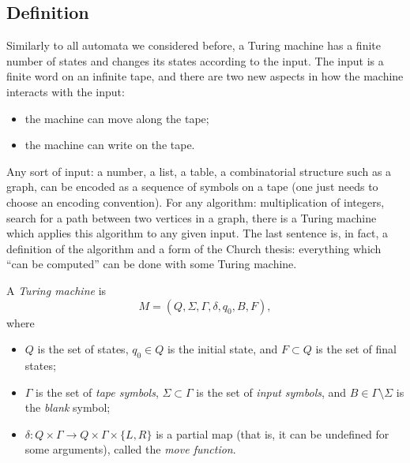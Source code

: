\begin{page}
\setcounter{section}{8}
\setcounter{subsection}{1}
\setcounter{dfn}{0}
\label{portion:1324}

\subsection{Definition}
Similarly to all automata we considered before,
a Turing machine has a finite number of states and changes its states according to the input.
The input is a finite word on an infinite tape, and there are two new aspects in how the machine interacts with the input:
\begin{itemize}
\item
the machine can move along the tape;
\item
the machine can write on the tape.
\end{itemize}

Any sort of input: a number, a list, a table, a combinatorial structure such as a graph,
can be encoded as a sequence of symbols on a tape (one just needs to choose an encoding convention).
For any algorithm: multiplication of integers, search for a path between two vertices in a graph,
there is a Turing machine which applies this algorithm to any given input.
The last sentence is, in fact, a definition of the algorithm and a form of the Church thesis:
everything which ``can be computed'' can be done with some Turing machine.


\end{page}

\begin{page}
\setcounter{section}{8}
\setcounter{subsection}{1}
\setcounter{dfn}{1}
\label{portion:1326}

\begin{dfn}
A \emph{Turing machine} is
\[
M = (Q, \Sigma, \Gamma, \delta, q_0, B, F),
\]
where
\begin{itemize}
\item
$Q$ is the set of states, $q_0 \in Q$ is the initial state, and $F \subset Q$ is the set of final states;
\item
$\Gamma$ is the set of \emph{tape symbols}, $\Sigma \subset \Gamma$ is the set of \emph{input symbols},
and $B \in \Gamma \setminus \Sigma$ is the \emph{blank} symbol;
\item
$\delta \colon Q \times \Gamma \to Q \times \Gamma \times \{L, R\}$
is a partial map (that is, it can be undefined for some arguments), called the \emph{move function}.
\end{itemize}
\end{dfn}

\end{page}


